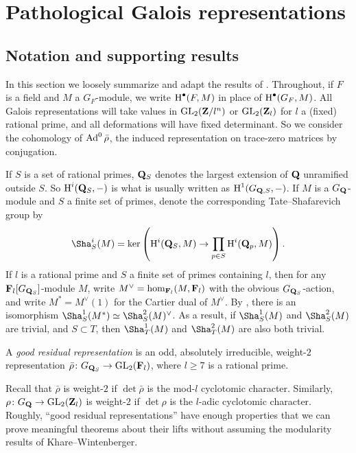 
\chapter{Pathological Galois representations}\label{ch:construct-Galois}





\section{Notation and supporting results}

In this section we loosely summarize and adapt the results of 
\cite{khare-larsen-ramakrishna-2005,pande-2011}. Throughout, if $F$ is a field 
and $M$ a $G_F$-module, we write $\operatorname{H}^\bullet(F,M)$ in place of 
$\operatorname{H}^\bullet(G_F,M)$. All Galois representations will take values in 
$\operatorname{GL}_2(\mathbf{Z}/l^n)$ or $\operatorname{GL}_2(\mathbf{Z}_l)$ for $l$ a (fixed) rational prime, and 
all deformations will have fixed determinant. So we consider the cohomology of 
$\operatorname{Ad}^0\bar\rho$, the induced representation on trace-zero matrices by 
conjugation. 

If $S$ is a set of rational primes, $\mathbf{Q}_S$ denotes the largest extension of 
$\mathbf{Q}$ unramified outside $S$. So $\operatorname{H}^i(\mathbf{Q}_S,-)$ is what is usually written as 
$\operatorname{H}^1(G_{\mathbf{Q},S},-)$. If $M$ is a $G_{\mathbf{Q}}$-module and $S$ a finite set of primes, 
denote the corresponding Tate--Shafarevich group by 
\[
	\Sha^i_S(M) = \ker\left( \h^i(\bQ_S,M) \to \prod_{p\in S} \h^i(\bQ_p,M)\right) .
\]
If $l$ is a rational prime and $S$ a finite set of primes containing $l$, then 
for any $\mathbf{F}_l[G_{\mathbf{Q}_S}]$-module $M$, write $M^\vee=\hom_{\mathbf{F}_l}(M,\mathbf{F}_l)$ 
with the obvious $G_{\mathbf{Q}_S}$-action, and write $M^\ast = M^\vee(1)$ for the 
Cartier dual of $M^\vee$. By \cite[Th.~8.6.7]{neukirch-schmidt-winberg-2008}, 
there is an isomorphism $\Sha^1_S(M^\ast) \simeq \Sha_S^2(M)^\vee$. As a 
result, if $\Sha_S^1(M)$ and $\Sha_S^2(M)$ are trivial, and $S\subset T$, then 
$\Sha_T^1(M)$ and $\Sha_T^2(M)$ are also both trivial. 

\begin{definition}
A \emph{good residual representation} is an odd, absolutely irreducible, 
weight-$2$ representation $\bar\rho\colon G_{\mathbf{Q}_S} \to \operatorname{GL}_2(\mathbf{F}_l)$, where 
$l\geqslant 7$ is a rational prime. 
\end{definition}

Recall that $\bar\rho$ is weight-$2$ if $\det\bar\rho$ is the mod-$l$ 
cyclotomic character. Similarly, $\rho\colon G_{\mathbf{Q}} \to \operatorname{GL}_2(\mathbf{Z}_l)$ is 
weight-$2$ if $\det\rho$ is the $l$-adic cyclotomic character. 
Roughly, ``good residual representations'' have enough properties that we can 
prove meaningful theorems about their lifts without assuming the modularity 
results of Khare--Wintenberger. 

